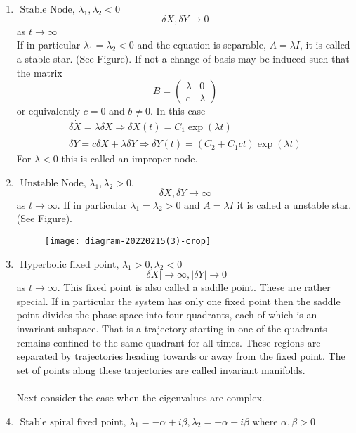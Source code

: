 \begin{enumerate}
	\item \textbf{$\text { Stable Node, } \lambda_{1}, \lambda_{2}<0$}
	$$
	\delta X, \delta Y \rightarrow 0
	$$
	as $t \rightarrow \infty$\\
	If in particular $\lambda_{1}=\lambda_{2}<0$ and the equation is separable, $A=\lambda I$, it is called a stable star. (See Figure). If not a change of basis may be induced such that the matrix
	$$
	B=\left(\begin{array}{ll}
	\lambda & 0 \\
	c & \lambda
	\end{array}\right)
	$$
	or equivalently $c=0$ and $b \neq 0$. In this case
	$$
	\begin{gathered}
	\delta \dot{X}=\lambda \delta X \Rightarrow \delta X(t)=C_{1} \exp (\lambda t) \\
	\delta \dot{Y}=c \delta X+\lambda \delta Y \Rightarrow \delta Y(t)=\left(C_{2}+C_{1} c t\right) \exp (\lambda t)
	\end{gathered}
	$$
	For $\lambda<0$ this is called an improper node.
	\item \textbf{$\text { Unstable Node, } \lambda_{1}, \lambda_{2}>0 \text {. }$}
	$$\delta X, \delta Y \rightarrow \infty$$
	as $t \rightarrow \infty .$ If in particular $\lambda_{1}=\lambda_{2}>0$ and $A=\lambda I$ it is called a unstable star.
	(See Figure).\\
	\begin{figure}[H]
		\centering
		\texttt{[image: diagram-20220215(3)-crop]}
		\caption{}
		\label{}
	\end{figure}
	\item \textbf{$\text { Hyperbolic fixed point, } \lambda_{1}>0, \lambda_{2}<0 $}
	$$|\delta X| \rightarrow \infty,|\delta Y| \rightarrow 0$$
	as $t \rightarrow \infty$. This fixed point is also called a saddle point. These are rather special. If in particular the system has only one fixed point then the saddle point divides the phase space into four quadrants, each of which is an invariant subspace. That is a trajectory starting in one of the quadrants remains confined to the same quadrant for all times. These regions are separated by trajectories heading towards or away from the fixed point. The set of points along these trajectories are called invariant manifolds.\\\\
	Next consider the case when the eigenvalues are complex.
	\item \textbf{$\text { Stable spiral fixed point, } \lambda_{1}=-\alpha+i \beta, \lambda_{2}=-\alpha-i \beta \text { where } \alpha, \beta>0$}

\end{enumerate}
